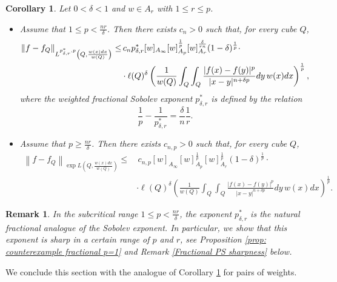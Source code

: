 \documentclass[reqno, 10pt, oneside]{amsart}
\numberwithin{equation}{section}
\newcommand{\strt}[1]{\rule{0pt}{#1}}
\newtheorem{corollary}[theorem]{Corollary}
\newtheorem{remark}[theorem]{Remark}
\numberwithin{theorem}{section}
\newcommand{\1}{{\rm 1\hspace*{-0.4ex}%
\rule{0.1ex}{1.52ex}\hspace*{0.2ex}}}
\begin{document}
\begin{corollary}\label{thm:fractional-PS}
	Let $0<\delta<1$ and $w\in A_r$ with $1\le r\le p$. 

	\begin{itemize}
		\item Assume that $1\le p < \frac{nr}{\delta}$. Then there exists $c_{n}>0$ such that, for every cube $Q$,
		\begin{align*}
			\left\| f-f_{Q}\right\|_{\strt{2.3ex} L^{p^*_{\delta, r}, p} \left(Q, \frac{w(x)dx}{w(Q)} \right)} 
			\le & \, c_n p^*_{\delta, r} [w]_{A_\infty} [w]_{A_p}^{\frac{1}{p}}[w]_{A_r}^{\frac{\delta }{rn}}(1-\delta)^\frac{1}{p} \cdot  \\
			& \cdot \ell(Q)^\delta \left( \frac{1}{w(Q)}\int_Q \int_Q \frac{|f(x)-f(y)|^p}{|x-y|^{n+\delta p }}dy\, w(x)dx \right)^\frac{1}{p},
		\end{align*}
        where the weighted fractional Sobolev exponent $p^{*}_{\delta, r}$ is defined by the relation
	   \begin{equation}\label{eq:fractional-exponent}
		  \frac{1}{p}- \frac{1}{p^{*}_{\delta, r}}=\frac{\delta}{n} \frac{1}{r}.
	   \end{equation}
		
		\item Assume that $p \ge \frac{nr}{\delta}$. Then there exists $c_{n,p}>0$ such that, for every cube $Q$,
		\begin{align*}
			\left\| f-f_Q\right\|_{\exp L \left(Q, \frac{w(x)dx}{w(Q)} \right)} 
			\le & \, c_{n,p} [w]_{A_\infty} [w]_{A_p}^{\frac{1}{p}}[w]_{A_r}^{\frac{1}{p}} (1-\delta)^\frac{1}{p} \cdot \nonumber \\
			& \cdot \ell(Q)^\delta \left( \frac{1}{w(Q)}\int_Q \int_Q \frac{|f(x)-f(y)|^p}{|x-y|^{n+\delta p }}dy\, w(x)dx \right)^\frac{1}{p}.
		\end{align*}
	\end{itemize}
\end{corollary}



\begin{remark}
In the subcritical range $1\le p<\frac{nr}{\delta}$, the exponent $p_{\delta, r}^*$ is the natural fractional analogue of the Sobolev exponent. In particular, we show that this exponent is sharp in a certain range of $p$ and $r$, see Proposition \ref{prop: counterexample fractional p=1} and Remark {\ref{Fractional PS sharpness}} below.
\end{remark}


We conclude this section with the analogue of Corollary \ref{thm:fractional-PS} for pairs of weights. 
\end{document}

